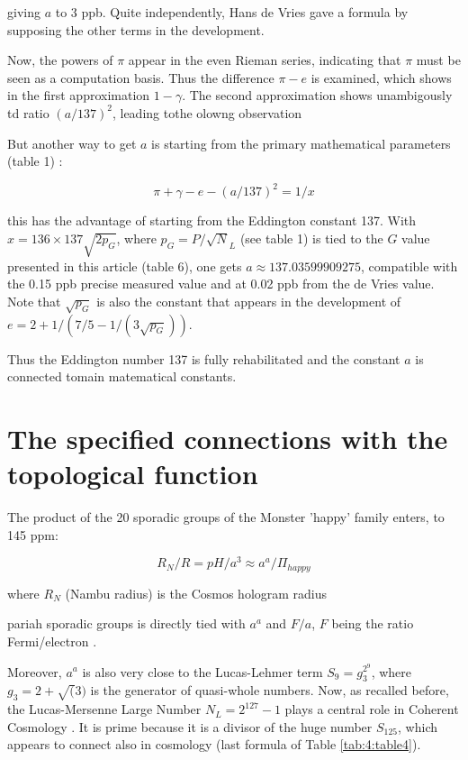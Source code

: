\documentclass[a4paper,9pt]{article}
\begin{document}
giving $a$ to 3 ppb. Quite independently, Hans de Vries \cite{deVries} gave a formula by supposing the other terms in the development.

Now, the powers of $\pi $ appear in the even Rieman series, indicating that $\pi$ must be seen as a computation basis. Thus the difference $\pi - e$ is examined, which shows in the first approximation $ 1-\gamma$. The second approximation shows unambigously td ratio $(a/137)^2$, leading tothe olowng observation



But another way to get $a$ is starting from the primary mathematical parameters (table 1) :
     
\begin{equation}
\pi+ \gamma - e - (a/137)^2 = 1/x
\end{equation}    

this has the advantage of starting from the Eddington constant  137. With $x = 136 \times 137 \sqrt{2p_G}$, where $p_G = P/\sqrt N_L$ (see table 1) is tied to the $G$ value presented in this article (table 6), one gets $a \approx 137.03599909275 $, compatible with the 0.15 ppb precise measured value and at 0.02 ppb from the de Vries value. Note that $\sqrt {p_G} $ is also the constant that appears in the development of $e = 2 + 1/(7/5 -1/(3\sqrt {p_G}))$. 


Thus the Eddington number 137 is fully rehabilitated and the constant $a$ is connected tomain matematical constants.





   
   
   \section{The specified connections with the topological function}

The product of the 20 sporadic groups of the Monster 'happy' family enters, to 145 ppm:

\begin{equation}
 R_N/R = pH/a^3 \approx a^a /\Pi_{happy}
\end{equation}

where $R_N$ (Nambu radius) is the Cosmos hologram radius \cite {Sanchez}



pariah sporadic groups is directly tied with $a^a$ and $F/a$, $F$ being the ratio Fermi/electron \cite{Sanchez}. 

Moreover, $a^a$  is also very close to the Lucas-Lehmer term $S_9 = g_3^{2^9}$, where $ g_3 = 2 + \sqrt(3)$ is the generator of quasi-whole numbers. Now, as recalled before, the Lucas-Mersenne Large Number $N_L = 2^{127} - 1$ plays a central role in Coherent Cosmology \cite{Sanchez}. It is prime because it is a divisor of the huge number $S_{125}$, which appears to connect also in cosmology (last formula of Table \ref{tab:4:table4}).
\end{document}
